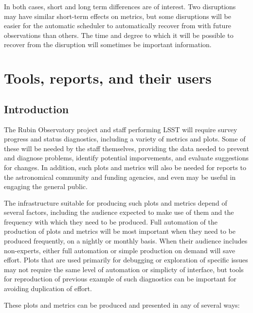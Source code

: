 In both cases, short and long term differences are of interest.
Two disruptions may have similar short-term effects on metrics, but some disruptions will be easier for the automatic scheduler to automatically recover from with future observations than others.
The time and degree to which it will be possible to recover from the disruption will sometimes be important information.

\section{Tools, reports, and their users}
\label{sec:orgc0fa9f8}
\subsection{Introduction}
\label{sec:orgb2a61f9}
The Rubin Observatory project and staff performing LSST will require survey progress and status diagnostics, including a variety of metrics and plots.
Some of these will be needed by the staff themselves, providing the data needed to prevent and diagnose problems, identify potential imporvements, and evaluate suggestions for changes.
In addition, such plots and metrics will also be needed for reports to the astronomical community and funding agencies, and even may be useful in engaging the general public.

The infrastructure suitable for producing such plots and metrics depend of several factors, including the audience expected to make use of them and the frequency with which they need to be produced.
Full automation of the production of plots and metrics will be most important when they need to be produced frequently, on a nightly or monthly basis.
When their audience includes non-experts, either full automation or simple production on demand will save effort.
Plots that are used primarily for debugging or exploration of specific issues may not require the same level of automation or simplicty of interface, but tools for reproduction of previous example of such diagnostics can be important for avoiding duplication of effort.

These plots and metrics can be produced and presented in any of several ways:

